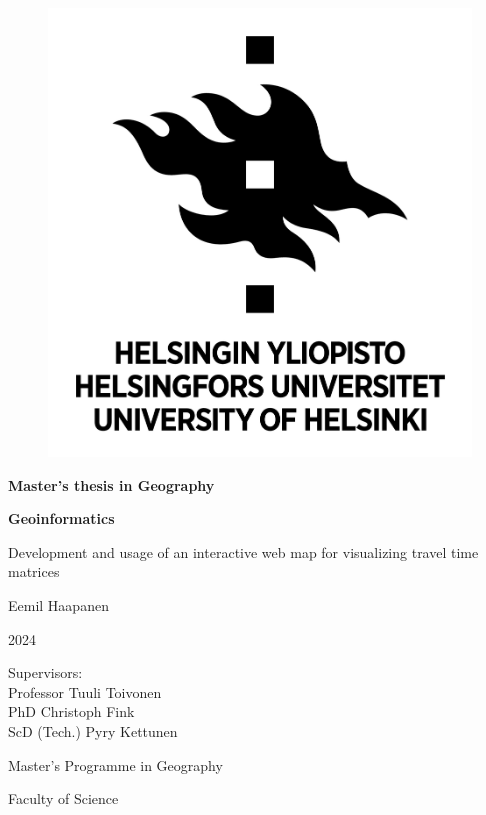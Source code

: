 \begin{center}{
    \begin{figure}[H]
        \centering
        \includegraphics[scale=0.4]{visual/other/helsinki_uni_logo.jpg}
    \end{figure}

    \bigskip
    \bigskip
    \bigskip
    \textbf{Master's thesis in Geography} \par
    \textbf{Geoinformatics} \par

    \bigskip
    \bigskip
    Development and usage of an interactive web map for visualizing travel time matrices

    \bigskip
    \bigskip
    Eemil Haapanen

    2024

    \vfill

    Supervisors: \\
    Professor Tuuli Toivonen \\
    PhD Christoph Fink \\
    ScD (Tech.) Pyry Kettunen \par
    \bigskip
    \bigskip
    \bigskip
    Master's Programme in Geography \par
    Faculty of Science \par
}
\end{center}
